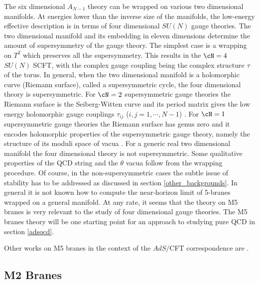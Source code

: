 The six dimensional $A_{N-1}$ theory can be wrapped on various two
dimensional manifolds. At energies lower than the inverse size of the
manifolds, the low-energy effective description is in terms of four
dimensional $SU(N)$ gauge theories.  The two dimensional manifold and
its embedding in eleven dimensions determine the amount of
supersymmetry of the gauge theory.  The simplest case is a wrapping on
$T^2$ which preserves all the supersymmetry.  This results in the $\cN
=4$ $SU(N)$ SCFT, with the complex gauge coupling being the complex
structure $\tau$ of the torus.  In general, when the two dimensional
manifold is a holomorphic curve (Riemann surface), called a
supersymmetric cycle, the four dimensional theory is supersymmetric.
For $\cN=2$ supersymmetric gauge theories the Riemann surface is the
Seiberg-Witten curve and its period matrix gives the low energy
holomorphic gauge couplings $\tau_{ij}$ ($i,j=1,\cdots,N-1$)
\cite{Kachru:1995wm,Kachru:1996fv,Klemm:1996bj,Witten:1997so}.  For $\cN=1$ supersymmetric gauge theories the
Riemann surface has genus zero and it encodes holomorphic properties
of the supersymmetric gauge theory, namely the structure of its moduli
space of vacua \cite{Hori:1998sc}.  For a generic real two dimensional
manifold the four dimensional theory is not supersymmetric.  Some
qualitative properties of the QCD string
\cite{Witten:1997ba} and the $\theta$ vacua follow from the wrapping
procedure.  Of course, in the non-supersymmetric cases the subtle
issue of stability has to be addressed as discussed in section
\ref{other_backgrounds}. In general it is not known how to compute the
near-horizon limit of 5-branes wrapped on a general manifold. At any
rate, it seems that the theory on M5 branes is very relevant to the
study of four dimensional gauge theories.  The M5 branes theory will
be one starting point for an approach to studying pure QCD in section
\ref{adsqcd}.

Other works on M5 branes in the context of the $AdS/$CFT correspondence are 
\cite{Castellani:1998nz,Russo:1998ze,Kallosh:1998qs,Grojean:1998zt,Ahn:1999qe,
Claus:1998mw,Claus:1999yw,
Awata:1998qy,Gutowski:1999iu,Forste:1999yj,
Fayyazuddin:1999zu, Bastianelli:1999bm}.

\subsection{M2 Branes}
\label{m2branes}

